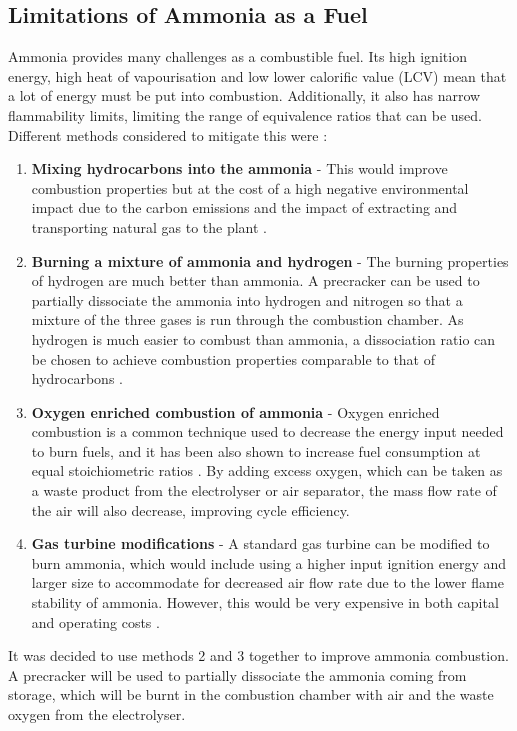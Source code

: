 \subsection{Limitations of Ammonia as a Fuel}
Ammonia provides many challenges as a combustible fuel. Its high ignition energy, high heat of vapourisation and low lower calorific value (LCV) mean that a lot of energy must be put into combustion. Additionally, it also has narrow flammability limits, limiting the range of equivalence ratios that can be used.  Different methods considered to mitigate this were \cite{verkamp}:
\begin {enumerate}
\item \textbf{Mixing hydrocarbons into the ammonia} - This would improve combustion properties but at the cost of a high negative environmental impact due to the carbon emissions and the impact of extracting and transporting natural gas to the plant \cite{verkamp}. 
\item \textbf{Burning a mixture of ammonia and hydrogen} - The burning properties of hydrogen are much better than ammonia. A precracker can be used to partially dissociate the ammonia into hydrogen and nitrogen so that a mixture of the three gases is run through the combustion chamber. As hydrogen is much easier to combust than ammonia, a dissociation ratio can be chosen to achieve combustion properties comparable to that of hydrocarbons \cite{verkamp}. 
\item \textbf{Oxygen enriched combustion of ammonia} - Oxygen enriched combustion is a common technique used to decrease the energy input needed to burn fuels, and it has been also shown to increase fuel consumption at equal stoichiometric ratios \cite{baskar}. By adding excess oxygen, which can be taken as a waste product from the electrolyser or air separator, the mass flow rate of the air will also decrease, improving cycle efficiency. 
\item \textbf{Gas turbine modifications} - A standard gas turbine can be modified to burn ammonia, which would include using a higher input ignition energy and larger size to accommodate for decreased air flow rate due to the lower flame stability of ammonia. However, this would be very expensive in both capital and operating costs \cite{verkamp} . 
\end {enumerate}

It was decided to use methods 2 and 3 together to improve ammonia combustion. A precracker will be used to partially dissociate the ammonia coming from storage, which will be burnt in the combustion chamber with air and the waste oxygen from the electrolyser.

